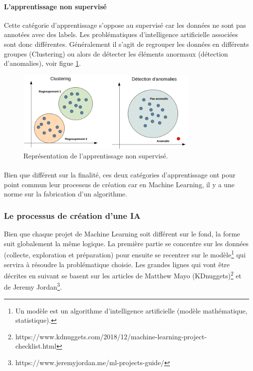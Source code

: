 \documentclass[10pt, french, a4paper]{report}
\begin{document}
\paragraph{L'apprentissage non supervisé}
Cette catégorie d'apprentissage s'oppose au supervisé car les données ne sont pas annotées avec des labels. Les problématiques d'intelligence artificielle associées sont donc différentes. Généralement il s'agit de regrouper les données en différents groupes (Clustering) ou alors de détecter les éléments anormaux (détection d'anomalies), voir figue \ref{fig:apprentissage_non_supervise}.

\begin{figure}[hbt!]
    \centering
    \includegraphics[width=0.8\textwidth]{images/apprentissage_non_supervise.png}
    \caption{Représentation de l'apprentissage non supervisé.}
    \label{fig:apprentissage_non_supervise}
\end{figure}

\paragraph{}
Bien que différent sur la finalité, ces deux catégories d'apprentissage ont pour point commun leur processus de création car en Machine Learning, il y a une norme sur la fabrication d'un algorithme.

\subsubsection{Le processus de création d'une IA}

Bien que chaque projet de Machine Learning soit différent sur le fond, la forme suit globalement la même logique. La première partie se concentre sur les données (collecte, exploration et préparation) pour ensuite se recentrer sur le modèle\footnote{Un modèle est un algorithme d’intelligence artificielle (modèle mathématique, statistique).} qui servira à résoudre la problématique choisie. Les grandes lignes qui vont être décrites en suivant se basent sur les articles de Matthew Mayo (KDnuggets)\footnote{https://www.kdnuggets.com/2018/12/machine-learning-project-checklist.html} et de Jeremy Jordan\footnote{https://www.jeremyjordan.me/ml-projects-guide/}.
\end{document}
